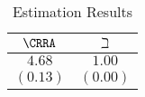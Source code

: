     \begin{table}[h]
      \caption{Estimation Results}\label{tab:EstResults}
      \center
      \begin{tabular}{cc}
        \hline
        $\CRRA $ & ${\beth}$\\
        \hline
        $4.68$ & $1.00$\\
        $(0.13)$ & $(0.00)$\\
        \hline
      \end{tabular}
    \end{table}
  
